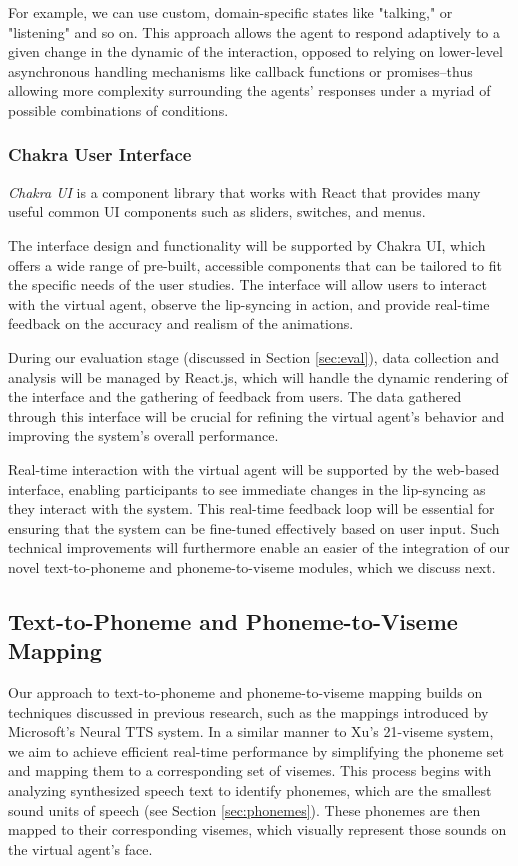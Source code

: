 \documentclass[12pt]{article}
\begin{document}
For example, we can use custom, domain-specific states like "talking," or "listening" and so on. This approach allows the agent to respond adaptively to a given change in the dynamic of the interaction, opposed to relying on lower-level asynchronous handling mechanisms like callback functions or promises--thus allowing more complexity surrounding the agents' responses under a myriad of possible combinations of conditions.

\subsubsection{Chakra User Interface}

{\em Chakra UI}  is a component library that works with React that provides many useful common UI components such as sliders, switches, and menus.

 The interface design and functionality will be supported by Chakra UI, which offers a wide range of pre-built, accessible components that can be tailored to fit the specific needs of the user studies. The interface will allow users to interact with the virtual agent, observe the lip-syncing in action, and provide real-time feedback on the accuracy and realism of the animations.

During our evaluation stage (discussed in Section \ref{sec:eval}), data collection and analysis will be managed by React.js, which will handle the dynamic rendering of the interface and the gathering of feedback from users. The data gathered through this interface will be crucial for refining the virtual agent’s behavior and improving the system’s overall performance. 

Real-time interaction with the virtual agent will be supported by the web-based interface, enabling participants to see immediate changes in the lip-syncing as they interact with the system. This real-time feedback loop will be essential for ensuring that the system can be fine-tuned effectively based on user input.
Such technical improvements will furthermore enable an easier of the integration of our novel text-to-phoneme and phoneme-to-viseme modules, which we discuss next.

\subsection{Text-to-Phoneme and Phoneme-to-Viseme Mapping}
Our approach to text-to-phoneme and phoneme-to-viseme mapping builds on techniques discussed in previous research, such as the mappings introduced by \cite{Xu2013AGames}  Microsoft’s Neural TTS system. In a similar manner to Xu’s 21-viseme system, we aim to achieve efficient real-time performance by simplifying the phoneme set and mapping them to a corresponding set of visemes. This process begins with analyzing synthesized speech text to identify phonemes, which are the smallest sound units of speech (see Section \ref{sec:phonemes}). These phonemes are then mapped to their corresponding visemes, which visually represent those sounds on the virtual agent's face.
\end{document}
